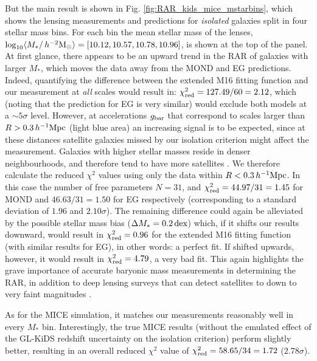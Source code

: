\documentclass[usenatbib]{mnras}
\newcommand{\hmsun}{\,h^{-2} {\rm M_\odot}}
\newcommand{\hMpc}{\, h^{-1}{\rm{Mpc}} }
\newcommand{\lan}{\langle}
\newcommand{\ran}{\rangle}
\newcommand{\un}[1]{_{\rm #1}}
\newcommand{\dex}{\, {\rm dex}}
\begin{document}
But the main result is shown in Fig. \ref{fig:RAR_kids_mice_mstarbins}, which shows the lensing measurements and predictions for \emph{isolated} galaxies split in four stellar mass bins. For each bin the mean stellar mass of the lenses, \textcolor{red}{$\log_{10}\lan M_*/\hmsun \ran = [10.12, 10.57, 10.78, 10.96]$}, is shown at the top of the panel. At first glance, there appears to be an upward trend in the RAR of galaxies with larger $M_*$, which moves the data away from the MOND and EG predictions. Indeed, quantifying the difference between the extended M16 fitting function and our measurement at \emph{all} scales would result in: $\chi\un{red}^2 = 127.49 / 60 = 2.12$, which (noting that the prediction for EG is very similar) would exclude both models at a $\sim5 \sigma$ level. However, at accelerations $g\un{bar}$ that correspond to scales larger than $R > 0.3 \hMpc$ (light blue area) an increasing signal is to be expected, since at these distances satellite galaxies missed by our isolation criterion might affect the measurement. Galaxies with higher stellar masses reside in denser neighbourhoods, and therefore tend to have more satellites \cite[see e.g.]{baldry2006, bolzonella2010, brouwer2016}. We therefore calculate the reduced $\chi^2$ values using only the data within $R < 0.3 \hMpc$. In this case the number of free parameters $N = 31$, and $\chi\un{red}^2 = 44.97 / 31 = 1.45$ for MOND and $46.63 / 31 = 1.50$ for EG respectively (corresponding to a standard deviation of $1.96$ and $2.10\sigma$). The remaining difference could again be alleviated by the possible stellar mass bias ($\Delta M_* = 0.2 \dex$) which, if it shifts our results downward, would result in $\chi\un{red}^2 = 0.96$ for the extended M16 fitting function (with similar results for EG), in other words: a perfect fit. If shifted upwards, however, it would result in $\chi\un{red}^2=4.79$, a very bad fit. This again highlights the grave importance of accurate baryonic mass measurements in determining the RAR, in addition to deep lensing surveys that can detect satellites to down to very faint magnitudes \cite[such as the future Euclid survey;][]{laureijs2011}.

As for the MICE simulation, it matches our measurements reasonably well in every $M_*$ bin. Interestingly, the true MICE results (without the emulated effect of the GL-KiDS redshift uncertainty on the isolation criterion) perform slightly better, resulting in an overall reduced $\chi^2$ value of $\chi\un{red}^2 = 58.65 / 34 = 1.72$ ($2.78 \sigma$).
\end{document}
